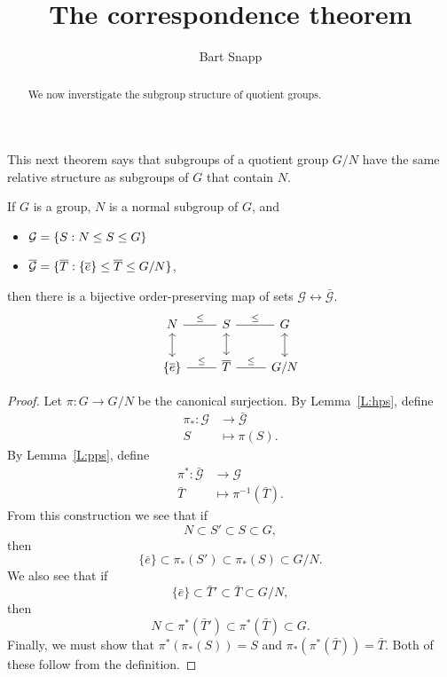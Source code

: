 \documentclass{ximera}
\author{Bart Snapp}
\title{The correspondence theorem}
\begin{document}
\begin{abstract}
  We now inverstigate the subgroup structure of quotient groups.
\end{abstract}
\maketitle

This next theorem says that subgroups of a quotient group $G/N$ have
the same relative structure as subgroups of $G$ that contain $N$.

\begin{theorem}
  If $G$ is a group, $N$ is a normal subgroup of $G$, and
  \begin{itemize}
  \item $\mathcal{G} = \{S:N\leq S\leq G\}$
  \item $\mathcal{\overline{G}} = \{\overline{T}:\{\overline{e}\}\leq \overline{T}\leq G/N\}$,
  \end{itemize}
  then there is a bijective order-preserving map of sets
  $\mathcal{G}\leftrightarrow\mathcal{\bar{G}}$.
  \[
  \begin{tikzcd}
    N \ar[r,-,"\subgp"] \ar[d,<->]& S\ar[r,-,"\subgp"] \ar[d,<->]& G \ar[d,<->]\\
    \{\bar{e}\} \ar[r,-,"\subgp"] & \bar{T} \ar[r,-,"\subgp"] & G/N
  \end{tikzcd}
  \]
  \begin{proof}
    Let $\pi:G\to G/N$ be the canonical surjection.  By
    Lemma~\ref{L:hps}, define
    \begin{align*}
    \pi_*:\mathcal{G} &\to \bar{\mathcal{G}}\\
    S &\mapsto \pi(S).
    \end{align*}
    By Lemma~\ref{L:pps}, define
    \begin{align*}
    \pi^*:\bar{\mathcal{G}} &\to \mathcal G\\
    \bar{T} &\mapsto \pi^{-1}(\bar{T}).
    \end{align*}
    From this construction we see that if
    \[
    N \subset S'\subset S \subset G,
    \]
    then
    \[
    \{\bar{e}\}\subset \pi_*(S') \subset \pi_*(S)\subset G/N.
    \]
    We also see that if
    \[
    \{\bar{e}\} \subset \bar{T}\hspace{0em}' \subset \bar{T} \subset G/N,
    \]
    then
    \[
    N \subset \pi^*(\bar{T}\hspace{0em}')\subset \pi^*(\bar{T}) \subset G.
    \]
    Finally, we must show that $\pi^*(\pi_*(S)) = S$ and
    $\pi_*(\pi^*(\bar T)) = \bar{T}$. Both of these follow from the
    definition.
  \end{proof}
\end{theorem}
\end{document}
